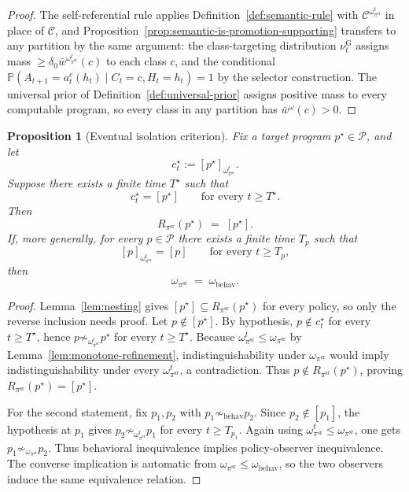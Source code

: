 \documentclass[11pt]{article}
\newtheorem{proposition}[theorem]{Proposition}
\theoremstyle{definition}
\theoremstyle{remark}
\newcommand{\Ccal}{\mathcal{C}}
\newcommand{\Pcal}{\mathcal{P}}
\newcommand{\Prob}{\mathbb{P}}
\begin{document}
\begin{proof}
The self-referential rule applies Definition~\ref{def:semantic-rule} with $\Ccal^{\omega_{\pi^{\mathrm{sr}}}^t}$ in place of $\Ccal$, and Proposition~\ref{prop:semantic-is-promotion-supporting} transfers to any partition by the same argument: the class-targeting distribution $\nu_t^{\mathrm G}$ assigns mass $\ge\delta_0\bar w^{\omega_{\pi^{\mathrm{sr}}}^t}(c)$ to each class $c$, and the conditional $\Prob(A_{t+1}=a_t^c(h_t)\mid C_t=c,H_t=h_t)=1$ by the selector construction. The universal prior of Definition~\ref{def:universal-prior} assigns positive mass to every computable program, so every class in any partition has $\bar w^\omega(c)>0$.
\end{proof}

\begin{proposition}[Eventual isolation criterion]
\label{prop:observer-promotion-sr}
Fix a target program $p^\star\in\Pcal$, and let
\[
c_t^\star:=[p^\star]_{\omega_{\pi^{\mathrm{sr}}}^t}.
\]
Suppose there exists a finite time $T^\star$ such that
\[
c_t^\star=[p^\star]
\qquad\text{for every }t\ge T^\star.
\]
Then
\[
R_{\pi^{\mathrm{sr}}}(p^\star)\;=\;[p^\star].
\]
If, more generally, for every $p\in\Pcal$ there exists a finite time $T_p$ such that
\[
[p]_{\omega_{\pi^{\mathrm{sr}}}^t}=[p]
\qquad\text{for every }t\ge T_p,
\]
then
\[
\omega_{\pi^{\mathrm{sr}}}\;=\;\omega_{\mathrm{behav}}.
\]
\end{proposition}

\begin{proof}
Lemma~\ref{lem:nesting} gives $[p^\star]\subseteq R_{\pi^{\mathrm{sr}}}(p^\star)$ for every policy, so only the reverse inclusion needs proof. Let $p\notin[p^\star]$. By hypothesis, $p\notin c_t^\star$ for every $t\ge T^\star$, hence $p\not\sim_{\omega_{\pi^{\mathrm{sr}}}^t}p^\star$ for every $t\ge T^\star$. Because $\omega_{\pi^{\mathrm{sr}}}^t\le\omega_{\pi^{\mathrm{sr}}}$ by Lemma~\ref{lem:monotone-refinement}, indistinguishability under $\omega_{\pi^{\mathrm{sr}}}$ would imply indistinguishability under every $\omega_{\pi^{\mathrm{sr}}}^t$, a contradiction. Thus $p\notin R_{\pi^{\mathrm{sr}}}(p^\star)$, proving $R_{\pi^{\mathrm{sr}}}(p^\star)=[p^\star]$.

For the second statement, fix $p_1,p_2$ with $p_1\not\sim_{\mathrm{behav}}p_2$. Since $p_2\notin[p_1]$, the hypothesis at $p_1$ gives $p_2\not\sim_{\omega_{\pi^{\mathrm{sr}}}^t}p_1$ for every $t\ge T_{p_1}$. Again using $\omega_{\pi^{\mathrm{sr}}}^t\le\omega_{\pi^{\mathrm{sr}}}$, one gets $p_1\not\sim_{\omega_{\pi^{\mathrm{sr}}}}p_2$. Thus behavioral inequivalence implies policy-observer inequivalence. The converse implication is automatic from $\omega_{\pi^{\mathrm{sr}}}\le\omega_{\mathrm{behav}}$, so the two observers induce the same equivalence relation.
\end{proof}
\end{document}
